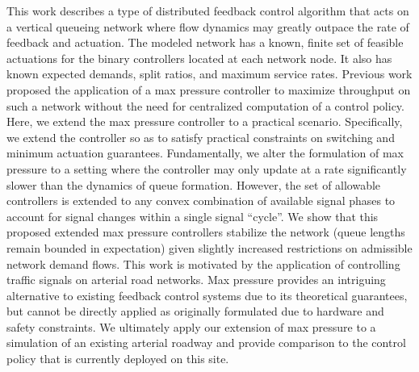 This work describes a type of distributed feedback control algorithm that acts on a vertical queueing network where flow dynamics may greatly outpace the rate of feedback and actuation. The modeled network has a known, finite set of feasible actuations for the binary controllers located at each network node. It also has known expected demands, split ratios, and maximum service rates. Previous work proposed the application of a max pressure controller to maximize throughput on such a network without the need for centralized computation of a control policy. Here, we extend the max pressure controller to a practical scenario.
Specifically, we extend the controller so as to satisfy practical constraints on switching and minimum actuation guarantees. Fundamentally, we alter the formulation of max pressure to a setting where the controller may only update at a rate significantly slower than the dynamics of queue formation. However, the set of allowable controllers is extended to any convex combination of available signal phases to account for signal changes within a single signal ``cycle''. We show that this proposed extended max pressure controllers stabilize the network (queue lengths remain bounded in expectation) given slightly increased restrictions on admissible network demand flows.  
This work is motivated by the application of controlling traffic signals on arterial road networks. Max pressure provides an intriguing alternative to existing feedback control systems due to its theoretical guarantees, but cannot be directly applied as originally formulated due to hardware and safety constraints. We ultimately apply our extension of max pressure to a simulation of an existing arterial roadway and provide comparison to the control policy that is currently deployed on this site. 

